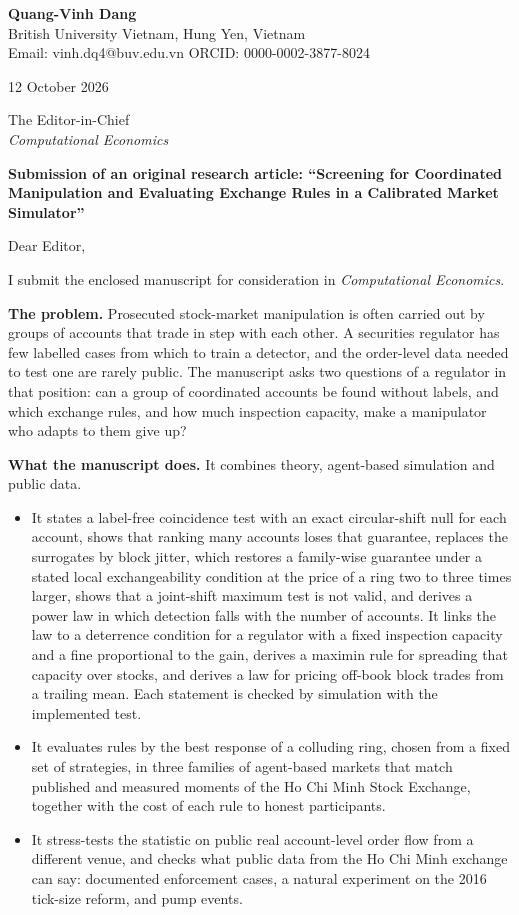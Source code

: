 \documentclass[10.5pt,a4paper]{article}
\begin{document}
\textbf{Quang-Vinh Dang}\\
British University Vietnam, Hung Yen, Vietnam\\
Email: vinh.dq4@buv.edu.vn \quad ORCID: 0000-0002-3877-8024

12 October 2026

The Editor-in-Chief\\
\emph{Computational Economics}

\textbf{Submission of an original research article: ``Screening for Coordinated Manipulation and Evaluating Exchange Rules in a Calibrated Market Simulator''}

Dear Editor,

I submit the enclosed manuscript for consideration in \emph{Computational Economics}.

\textbf{The problem.} Prosecuted stock-market manipulation is often carried out by groups of accounts that trade in step with each other. A securities regulator has few labelled cases from which to train a detector, and the order-level data needed to test one are rarely public. The manuscript asks two questions of a regulator in that position: can a group of coordinated accounts be found without labels, and which exchange rules, and how much inspection capacity, make a manipulator who adapts to them give up?

\textbf{What the manuscript does.} It combines theory, agent-based simulation and public data.
\begin{itemize}\itemsep0pt
\item It states a label-free coincidence test with an exact circular-shift null for each account, shows that ranking many accounts loses that guarantee, replaces the surrogates by block jitter, which restores a family-wise guarantee under a stated local exchangeability condition at the price of a ring two to three times larger, shows that a joint-shift maximum test is not valid, and derives a power law in which detection falls with the number of accounts. It links the law to a deterrence condition for a regulator with a fixed inspection capacity and a fine proportional to the gain, derives a maximin rule for spreading that capacity over stocks, and derives a law for pricing off-book block trades from a trailing mean. Each statement is checked by simulation with the implemented test.
\item It evaluates rules by the best response of a colluding ring, chosen from a fixed set of strategies, in three families of agent-based markets that match published and measured moments of the Ho Chi Minh Stock Exchange, together with the cost of each rule to honest participants.
\item It stress-tests the statistic on public real account-level order flow from a different venue, and checks what public data from the Ho Chi Minh exchange can say: documented enforcement cases, a natural experiment on the 2016 tick-size reform, and pump events.
\end{itemize}
\end{document}
